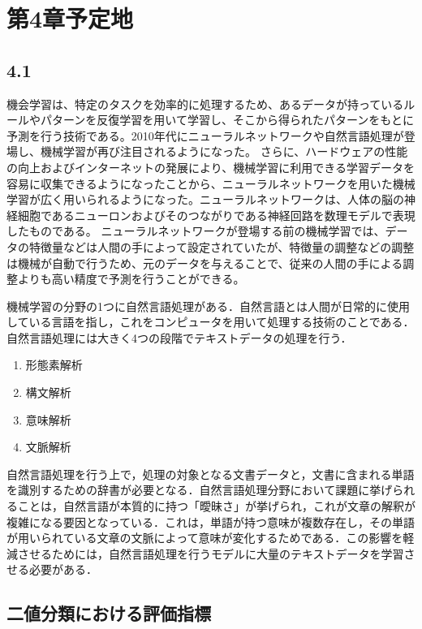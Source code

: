 \chapter{第4章予定地\label{c4}}

\section{4.1\label{c4s1}}
機会学習は、特定のタスクを効率的に処理するため、あるデータが持っているルールやパターンを反復学習を用いて学習し、そこから得られたパターンをもとに予測を行う技術である。2010年代にニューラルネットワークや自然言語処理が登場し、機械学習が再び注目されるようになった。
さらに、ハードウェアの性能の向上およびインターネットの発展により、機械学習に利用できる学習データを容易に収集できるようになったことから、ニューラルネットワークを用いた機械学習が広く用いられるようになった。ニューラルネットワークは、人体の脳の神経細胞であるニューロンおよびそのつながりである神経回路を数理モデルで表現したものである。
ニューラルネットワークが登場する前の機械学習では、データの特徴量などは人間の手によって設定されていたが、特徴量の調整などの調整は機械が自動で行うため、元のデータを与えることで、従来の人間の手による調整よりも高い精度で予測を行うことができる。

機械学習の分野の1つに自然言語処理がある．自然言語とは人間が日常的に使用している言語を指し，これをコンピュータを用いて処理する技術のことである．自然言語処理には大きく4つの段階でテキストデータの処理を行う．

\begin{enumerate}
    \item 形態素解析
    \item 構文解析
    \item 意味解析
    \item 文脈解析
\end{enumerate}

自然言語処理を行う上で，処理の対象となる文書データと，文書に含まれる単語を識別するための辞書が必要となる．自然言語処理分野において課題に挙げられることは，自然言語が本質的に持つ「曖昧さ」が挙げられ，これが文章の解釈が複雑になる要因となっている．これは，単語が持つ意味が複数存在し，その単語が用いられている文章の文脈によって意味が変化するためである．この影響を軽減させるためには，自然言語処理を行うモデルに大量のテキストデータを学習させる必要がある．

\section{二値分類における評価指標 \label{c4s2}}

